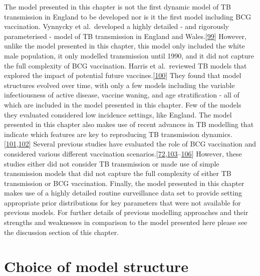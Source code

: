 \documentclass[11pt,twoside]{bristolthesis}
\begin{document}
  The model presented in this chapter is not the first dynamic model of TB transmission in England to be developed nor is it the first model including BCG vaccination. Vynnycky et al.~developed a highly detailed - and rigorously parameterised - model of TB transmission in England and Wales.{[}\protect\hyperlink{ref-Vynnycky1997a}{99}{]} However, unlike the model presented in this chapter, this model only included the white male population, it only modelled transmission until 1990, and it did not capture the full complexity of BCG vaccination. Harris et al.~reviewed TB models that explored the impact of potential future vaccines.{[}\protect\hyperlink{ref-Harris2016}{100}{]} They found that model structures evolved over time, with only a few models including the variable infectiousness of active disease, vaccine waning, and age stratification - all of which are included in the model presented in this chapter. Few of the models they evaluated considered low incidence settings, like England. The model presented in this chapter also makes use of recent advances in TB modelling that indicate which features are key to reproducing TB transmission dynamics.{[}\protect\hyperlink{ref-Ragonnet2017}{101},\protect\hyperlink{ref-Brooks-Pollock2010}{102}{]} Several previous studies have evaluated the role of BCG vaccination and considered various different vaccination scenarios.{[}\protect\hyperlink{ref-Usher2016}{72},\protect\hyperlink{ref-Manissero2008a}{103}--\protect\hyperlink{ref-Bhunu2008b}{106}{]} However, these studies either did not consider TB transmission or made use of simple transmission models that did not capture the full complexity of either TB transmission or BCG vaccination. Finally, the model presented in this chapter makes use of a highly detailed routine surveillance data set to provide setting appropriate prior distributions for key parameters that were not available for previous models. For further details of previous modelling approaches and their strengths and weaknesses in comparison to the model presented here please see the discussion section of this chapter.
  
  \hypertarget{model-just}{%
  \section{Choice of model structure}\label{model-just}}
  
\end{document}
